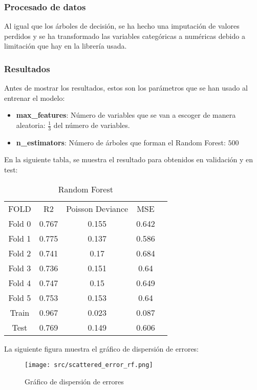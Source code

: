 \subsubsection*{Procesado de datos}
Al igual que los árboles de decisión, se ha hecho una imputación de valores perdidos y se ha transformado las variables categóricas a numéricas debido a limitación que hay en la librería usada.
\subsubsection*{Resultados}
Antes de mostrar los resultados, estos son los parámetros que se han usado al entrenar el modelo:
\begin{itemize}
	\item \textbf{max\_features}: Número de variables que se van a escoger de manera aleatoria: $\frac{1}{3}$ del número de variables.
	\item\textbf{n\_estimators}: Número de árboles que forman el Random Forest: $500$
\end{itemize}
En la siguiente tabla, se muestra el resultado para obtenidos en validación y en test:
\linebreak
\begin{table}[H]
	\centering
	\begin{tabular}{|c|c|c|c|c}
		\cline{1-4}
		FOLD   & R2    & Poisson Deviance & MSE   \\ \cline{1-4}
		Fold 0 & 0.767 & 0.155            & 0.642 \\ \cline{1-4}
		Fold 1 & 0.775 & 0.137            & 0.586 \\ \cline{1-4}
		Fold 2 & 0.741 & 0.17             & 0.684 \\ \cline{1-4}
		Fold 3 & 0.736 & 0.151            & 0.64  \\ \cline{1-4}
		Fold 4 & 0.747 & 0.15             & 0.649 \\ \cline{1-4}
		Fold 5 & 0.753 & 0.153            & 0.64  \\ \cline{1-4}
		Train  & 0.967 & 0.023            & 0.087 \\ \cline{1-4}
		Test   & 0.769 & 0.149            & 0.606 \\ \cline{1-4}
	\end{tabular}
	\caption{Random Forest}
	\label{tab:res_random_forest}
\end{table}
\pagebreak
La siguiente figura muestra el gráfico de dispersión de errores:
\begin{figure}[H]
	\centering
	\texttt{[image: src/scattered\_error\_rf.png]}
	\caption{Gráfico de dispersión de errores}
	\label{fig:rf_scattered}
\end{figure}
